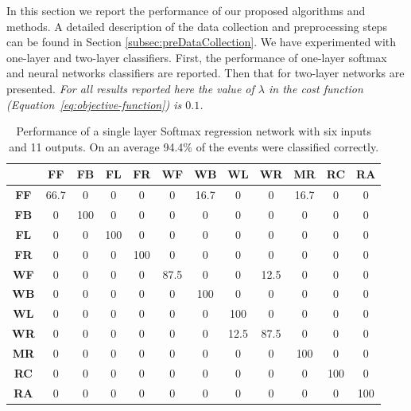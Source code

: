\documentclass[]{IEEEtran}
\begin{document}
In this section we report the performance of our proposed algorithms and methods. A detailed description of the data collection and preprocessing steps can be found in Section \ref{subsec:preDataCollection}.
We have experimented with one-layer and two-layer classifiers.  First, the performance of one-layer softmax and neural networks classifiers are reported. Then that for two-layer networks are presented. 
\emph{For all results reported here the value of $\lambda$ in the cost function 
(Equation~\ref{eq:objective-function}) is $0.1$.}

\begin{table}[htb]
\caption{Performance of a single layer Softmax regression network with six inputs and 11 outputs. On an average 94.4\% of the events were classified correctly.}
\label{tab:softmaxOnelayer}
\resizebox{\columnwidth}{!}
{
\begin{tabular}{|c|c|c|c|c|c|c|c|c|c|c|c|}
\hline 
& \textbf{FF} & \textbf{FB}  & \textbf{FL} & \textbf{FR} &  \textbf{WF} & 
\textbf{WB} & \textbf{WL} & \textbf{WR} & \textbf{MR} & 
\textbf{RC} & \textbf{RA} \\ \hline
\textbf{FF} & 66.7 &  0 &  0 &  0 &  0 &  16.7 &  0 &  0 &  16.7 &  0 &  0 \\ \hline
\textbf{FB} & 0 &  100 &  0 &  0 &  0 &  0 &  0 &  0 &  0 &  0 &  0 \\ \hline
\textbf{FL} & 0 &  0 &  100 &  0 &  0 &  0 &  0 &  0 &  0 &  0 &  0 \\ \hline
\textbf{FR} & 0 &  0 &  0 &  100 &  0 &  0 &  0 &  0 &  0 &  0 &  0 \\ \hline
\textbf{WF} & 0 &  0 &  0 &  0 &  87.5 &  0 &  0 &  12.5 &  0 &  0 &  0 \\ \hline
\textbf{WB} & 0 &  0 &  0 &  0 &  0 &  100 &  0 &  0 &  0 &  0 &  0 \\ \hline
\textbf{WL} & 0 &  0 &  0 &  0 &  0 &  0 &  100 &  0 &  0 &  0 &  0 \\ \hline
\textbf{WR} & 0 &  0 &  0 &  0 &  0 &  0 &  12.5 &  87.5 &  0 &  0 &  0 \\ \hline
\textbf{MR} & 0 &  0 &  0 &  0 &  0 &  0 &  0 &  0 &  100 &  0 &  0 \\ \hline
\textbf{RC} & 0 &  0 &  0 &  0 &  0 &  0 &  0 &  0 &  0 &  100 &  0 \\ \hline
\textbf{RA} & 0 &  0 &  0 &  0 &  0 &  0 &  0 &  0 &  0 &  0 &  100 \\ \hline
\end{tabular}
}
\end{table}
\end{document}
